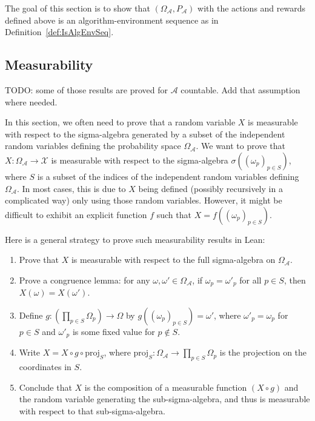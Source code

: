 The goal of this section is to show that $(\Omega_{\mathcal{A}}, P_{\mathcal{A}})$ with the actions and rewards defined above is an algorithm-environment sequence as in Definition~\ref{def:IsAlgEnvSeq}.


\subsection{Measurability}

TODO: some of those results are proved for $\mathcal{A}$ countable. Add that assumption where needed.

\begin{remark}
In this section, we often need to prove that a random variable $X$ is measurable with respect to the sigma-algebra generated by a subset of the independent random variables defining the probability space $\Omega_{\mathcal{A}}$.
We want to prove that $X : \Omega_{\mathcal{A}} \to \mathcal{X}$ is measurable with respect to the sigma-algebra $\sigma((\omega_p)_{p \in S})$, where $S$ is a subset of the indices of the independent random variables defining $\Omega_{\mathcal{A}}$.
In most cases, this is due to $X$ being defined (possibly recursively in a complicated way) only using those random variables.
However, it might be difficult to exhibit an explicit function $f$ such that $X = f((\omega_p)_{p \in S})$.

Here is a general strategy to prove such measurability results in Lean:
\begin{enumerate}
  \item Prove that $X$ is measurable with respect to the full sigma-algebra on $\Omega_{\mathcal{A}}$.
  \item Prove a congruence lemma: for any $\omega, \omega' \in \Omega_{\mathcal{A}}$, if $\omega_p = \omega'_p$ for all $p \in S$, then $X(\omega) = X(\omega')$.
  \item Define $g : (\prod_{p \in S} \Omega_p) \to \Omega$ by $g((\omega_p)_{p \in S}) = \omega'$, where $\omega'_p = \omega_p$ for $p \in S$ and $\omega'_p$ is some fixed value for $p \notin S$.
  \item Write $X = X \circ g \circ \mathrm{proj}_S$, where $\mathrm{proj}_S : \Omega_{\mathcal{A}} \to \prod_{p \in S} \Omega_p$ is the projection on the coordinates in $S$.
  \item Conclude that $X$ is the composition of a measurable function $(X \circ g)$ and the random variable generating the sub-sigma-algebra, and thus is measurable with respect to that sub-sigma-algebra.
\end{enumerate}
\end{remark}

